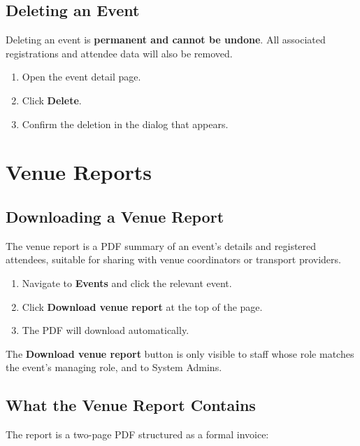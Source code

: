 \documentclass[12pt, twoside]{report}
\newcommand{\uielem}[1]{\textbf{#1}}
\begin{document}
\section{Deleting an Event}

\begin{warnbox}
Deleting an event is \textbf{permanent and cannot be undone}. All associated
registrations and attendee data will also be removed.
\end{warnbox}

\begin{enumerate}
  \item Open the event detail page.
  \item Click \uielem{Delete}.
  \item Confirm the deletion in the dialog that appears.
\end{enumerate}


\chapter{Venue Reports}

\section{Downloading a Venue Report}

The venue report is a PDF summary of an event's details and registered
attendees, suitable for sharing with venue coordinators or transport providers.

\begin{enumerate}
  \item Navigate to \uielem{Events} and click the relevant event.
  \item Click \uielem{Download venue report} at the top of the page.
  \item The PDF will download automatically.
\end{enumerate}

\begin{notebox}
The \uielem{Download venue report} button is only visible to staff whose
role matches the event's managing role, and to System Admins.
\end{notebox}

\section{What the Venue Report Contains}

The report is a two-page PDF structured as a formal invoice:
\end{document}
